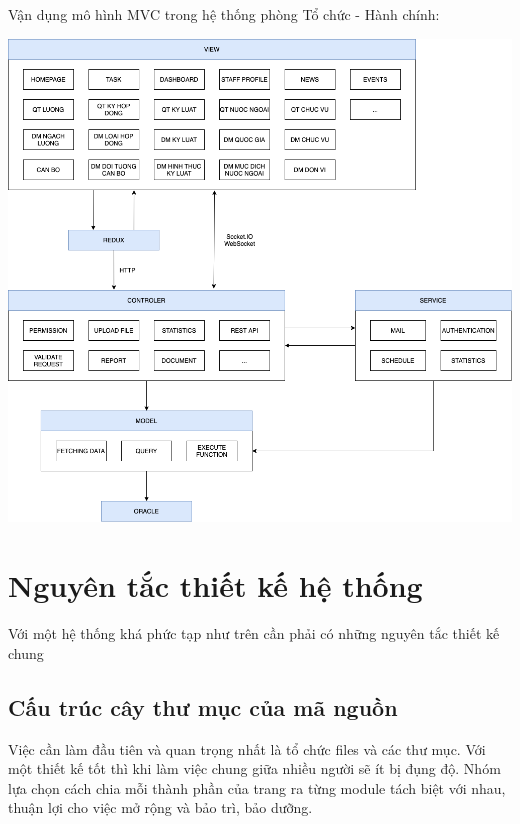 Vận dụng mô hình MVC trong hệ thống phòng Tổ chức - Hành chính:
\begin{center}
  \captionsetup{type=figure}
  \includegraphics[width=15cm]{img/MVCInTchc.png}
\end{center}

\section{Nguyên tắc thiết kế hệ thống}
\indent Với một hệ thống khá phức tạp như trên cần phải có những nguyên tắc thiết kế chung
\subsection{Cấu trúc cây thư mục của mã nguồn}
Việc cần làm đầu tiên và quan trọng nhất là tổ chức files và các thư mục. Với một thiết kế tốt thì khi làm việc chung giữa nhiều người sẽ ít bị đụng độ. Nhóm lựa chọn cách chia mỗi thành phần của trang ra từng module tách biệt với nhau, thuận lợi cho việc mở rộng và bảo trì, bảo dưỡng.\\

